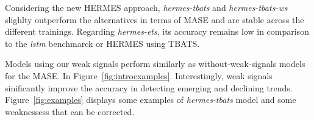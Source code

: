 \documentclass{article} %
\begin{document}
Considering the new HERMES approach, \textit{hermes-tbats} and \textit{hermes-tbats-ws} slighlty outperform the alternatives in terms of MASE and are stable across the different trainings. Regarding \textit{hermes-ets},  its accuracy remains low in comparison to the \textit{lstm} benchmarck or HERMES using TBATS. 

Models using our weak signals perform similarly as without-weak-signals models for the MASE. In Figure~\ref{fig:introexamples}. Interestingly, weak signals sinificantly improve the accuracy in detecting emerging and declining trends. Figure~\ref{fig:examples} displays some examples of \textit{hermes-tbats} model and some weaknessess that can be corrected.

\end{document}
